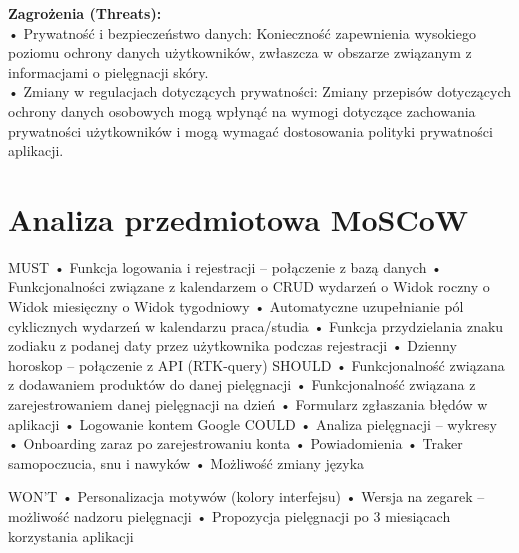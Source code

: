 \textbf{Zagrożenia (Threats):}\\
•	Prywatność i bezpieczeństwo danych: Konieczność zapewnienia wysokiego poziomu ochrony danych użytkowników, zwłaszcza w obszarze związanym z informacjami o pielęgnacji skóry.\\
•	Zmiany w regulacjach dotyczących prywatności: Zmiany przepisów dotyczących ochrony danych osobowych mogą wpłynąć na wymogi dotyczące zachowania prywatności użytkowników i mogą wymagać dostosowania polityki prywatności aplikacji.\\

\section{Analiza przedmiotowa MoSCoW}

MUST
•	Funkcja logowania i rejestracji – połączenie z bazą danych
•	Funkcjonalności związane z kalendarzem 
o	CRUD wydarzeń 
o	Widok roczny
o	Widok miesięczny
o	Widok tygodniowy 
•	Automatyczne uzupełnianie pól cyklicznych wydarzeń w kalendarzu praca/studia
•	Funkcja przydzielania znaku zodiaku z podanej daty przez użytkownika podczas rejestracji 
•	Dzienny horoskop – połączenie z API (RTK-query)
SHOULD
•	Funkcjonalność związana z dodawaniem produktów do danej pielęgnacji 
•	Funkcjonalność związana z zarejestrowaniem danej pielęgnacji na dzień
•	Formularz zgłaszania błędów w aplikacji 
•	Logowanie kontem Google
COULD
•	Analiza pielęgnacji – wykresy 
•	Onboarding zaraz po zarejestrowaniu konta 
•	Powiadomienia 
•	Traker samopoczucia, snu i nawyków
•	Możliwość zmiany języka


WON’T
•	Personalizacja motywów (kolory interfejsu)
•	Wersja na zegarek – możliwość nadzoru pielęgnacji 
•	Propozycja pielęgnacji po 3 miesiącach korzystania aplikacji 
